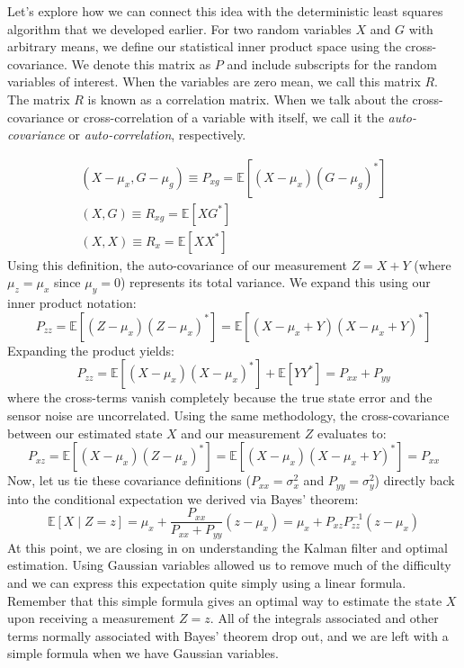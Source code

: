 Let's explore how we can connect this idea with the deterministic least squares algorithm that we developed earlier. For two random variables $X$ and $G$ with arbitrary means, we define our statistical inner product space using the cross-covariance. We denote this matrix as $P$ and include subscripts for the random variables of interest. When the variables are zero mean, we call this matrix $R$. The matrix $R$ is known as a correlation matrix. When we talk about the cross-covariance or cross-correlation of a variable with itself, we call it the \textit{auto-covariance} or \textit{auto-correlation}, respectively.

\begin{gather}
(X - \mu_x, G - \mu_g )\equiv P_{xg} = \mathbb{E}[(X - \mu_x)(G - \mu_g)^*]\\
(X , G  )\equiv R_{xg} = \mathbb{E}[XG^*]\\
(X,X)\equiv R_{x}=\mathbb{E}[XX^*]
\end{gather}
Using this definition, the auto-covariance of our measurement $Z = X+Y$ (where $\mu_z = \mu_x$ since $\mu_y = 0$) represents its total variance. We expand this using our inner product notation:
\begin{equation}
P_{zz} = \mathbb{E}[(Z - \mu_x)(Z - \mu_x)^*] = \mathbb{E}[(X - \mu_x + Y)(X - \mu_x + Y)^*]
\end{equation}
Expanding the product yields:
\begin{equation}
P_{zz} = \mathbb{E}[(X - \mu_x)(X - \mu_x)^*] + \mathbb{E}[YY^*] = P_{xx} + P_{yy}
\end{equation}
where the cross-terms vanish completely because the true state error and the sensor noise are uncorrelated. Using the same methodology, the cross-covariance between our estimated state $X$ and our measurement $Z$ evaluates to:
\begin{equation}
P_{xz} = \mathbb{E}[(X - \mu_x)(Z - \mu_x)^*] = \mathbb{E}[(X - \mu_x)(X - \mu_x + Y)^*] = P_{xx}
\end{equation}
Now, let us tie these covariance definitions ($P_{xx} = \sigma_x^2$ and $P_{yy} = \sigma_y^2$) directly back into the conditional expectation we derived via Bayes' theorem:
\begin{equation}
\mathbb{E}[X \mid Z=z] = \mu_x + \frac{P_{xx}}{P_{xx} + P_{yy}}(z - \mu_x) = \mu_x + P_{xz} P_{zz}^{-1}(z - \mu_x)
\end{equation}
At this point, we are closing in on understanding the Kalman filter and optimal estimation. Using Gaussian variables allowed us to remove much of the difficulty and we can express this expectation quite simply using a linear formula. Remember that this simple formula gives an optimal way to estimate the state $X$ upon receiving a measurement $Z=z$. All of the integrals associated and other terms normally associated with Bayes' theorem drop out, and we are left with a simple formula when we have Gaussian variables.

